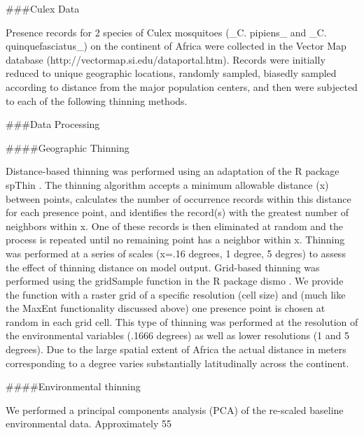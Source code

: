 ###Culex Data 

Presence records for 2 species of Culex mosquitoes (_C. pipiens_ and _C. quinquefasciatus_) on the continent of Africa were collected in the Vector Map database (http://vectormap.si.edu/dataportal.htm). Records were initially reduced to unique geographic locations, randomly sampled, biasedly sampled according to distance from the major population centers, and then were subjected to each of the following thinning methods. 

###Data Processing

####Geographic Thinning

Distance-based thinning was performed using an adaptation of the R package spThin \cite{AielloLammens:2015ik}. The thinning algorithm accepts a minimum allowable distance (x) between points, calculates the number of occurrence records within this distance for each presence point, and identiﬁes the record(s) with the greatest number of neighbors within x. One of these records is then eliminated at random and the process is repeated until no remaining point has a neighbor within x. Thinning was performed at a series of scales (x=.16 degrees, 1 degree, 5 degres) to assess the eﬀect of thinning distance on model output. Grid-based thinning was performed using the gridSample function in the R package dismo \cite{Hijmans:2015ut}. We provide the function with a raster grid of a speciﬁc resolution (cell size) and (much like the MaxEnt functionality discussed above) one presence point is chosen at random in each grid cell. This type of thinning was performed at the resolution of the environmental variables (.1666 degrees) as well as lower resolutions (1 and 5 degrees). Due to the large spatial extent of Africa the actual distance in meters corresponding to a degree varies substantially latitudinally across the continent. 

####Environmental thinning

We performed a principal components analysis (PCA) of the re-scaled baseline environmental data. Approximately 55%

